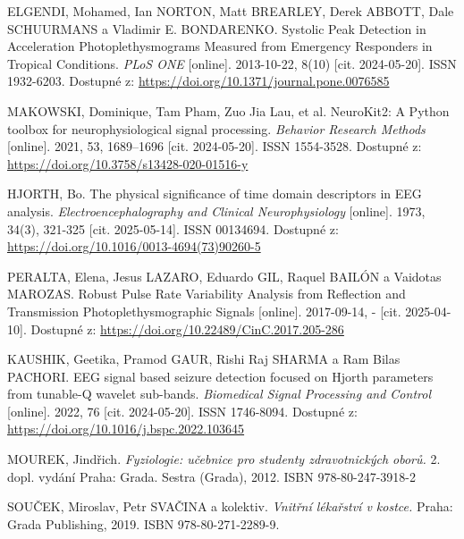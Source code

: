 \begin{thebibliography}{99}
		ELGENDI, Mohamed, Ian NORTON, Matt BREARLEY, Derek ABBOTT, Dale SCHUURMANS a Vladimir E. BONDARENKO.
		Systolic Peak Detection in Acceleration Photoplethysmograms Measured from Emergency Responders in Tropical Conditions.
		\emph{PLoS ONE} [online].
		2013-10-22, 8(10) [cit. 2024-05-20].
		ISSN 1932-6203.
		Dostupné z: \url{https://doi.org/10.1371/journal.pone.0076585}

		MAKOWSKI, Dominique, Tam Pham, Zuo Jia Lau, et al.
		NeuroKit2: A Python toolbox for neurophysiological signal processing.
		\emph{Behavior Research Methods} [online].
		2021, 53, 1689–1696 [cit. 2024-05-20].
		ISSN 1554-3528.
		Dostupné z: \url{https://doi.org/10.3758/s13428-020-01516-y}

		HJORTH, Bo.
		The physical significance of time domain descriptors in EEG analysis.
		\emph{Electroencephalography and Clinical Neurophysiology} [online].
		1973, 34(3), 321-325 [cit. 2025-05-14].
		ISSN 00134694.
		Dostupné z: \url{https://doi.org/10.1016/0013-4694(73)90260-5}

		PERALTA, Elena, Jesus LAZARO, Eduardo GIL, Raquel BAILÓN a Vaidotas MAROZAS.
		Robust Pulse Rate Variability Analysis from Reflection and Transmission Photoplethysmographic Signals [online].
		2017-09-14, - [cit. 2025-04-10].
		Dostupné z: \url{https://doi.org/10.22489/CinC.2017.205-286}

		KAUSHIK, Geetika, Pramod GAUR, Rishi Raj SHARMA a Ram Bilas PACHORI.
		EEG signal based seizure detection focused on Hjorth parameters from tunable-Q wavelet sub-bands.
		\emph{Biomedical Signal Processing and Control} [online].
		2022, 76 [cit. 2024-05-20].
		ISSN 1746-8094.
		Dostupné z: \url{https://doi.org/10.1016/j.bspc.2022.103645}

		MOUREK, Jindřich.
		\emph{Fyziologie: učebnice pro studenty zdravotnických oborů.}
		2.\, dopl. vydání Praha: Grada. Sestra (Grada), 2012.
		ISBN 978-80-247-3918-2

		SOUČEK, Miroslav, Petr SVAČINA a kolektiv.
		\emph{Vnitřní lékařství v kostce.}
		Praha: Grada Publishing, 2019.
		ISBN 978-80-271-2289-9.


\end{thebibliography}
